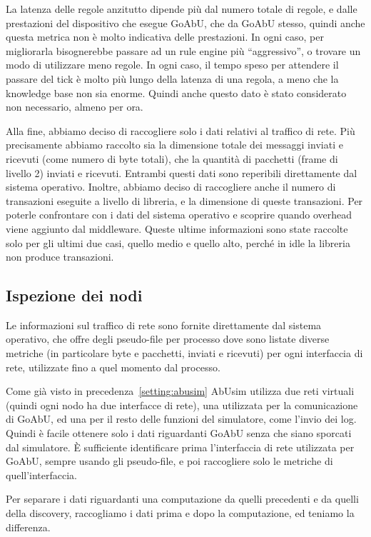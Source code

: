\documentclass[12pt, a4paper]{article}
\begin{document}
La latenza delle regole anzitutto dipende più dal numero totale di regole, e dalle prestazioni del dispositivo che esegue GoAbU, che da GoAbU stesso, quindi anche questa metrica non è molto indicativa delle prestazioni.
In ogni caso, per migliorarla bisognerebbe passare ad un rule engine più ``aggressivo'', o trovare un modo di utilizzare meno regole.
In ogni caso, il tempo speso per attendere il passare del tick è molto più lungo della latenza di una regola, a meno che la knowledge base non sia enorme.
Quindi anche questo dato è stato considerato non necessario, almeno per ora.

Alla fine, abbiamo deciso di raccogliere solo i dati relativi al traffico di rete. Più precisamente abbiamo raccolto sia la dimensione totale dei messaggi inviati e ricevuti (come numero di byte totali), che la quantità di pacchetti (frame di livello 2) inviati e ricevuti. Entrambi questi dati sono reperibili direttamente dal sistema operativo.
Inoltre, abbiamo deciso di raccogliere anche il numero di transazioni eseguite a livello di libreria, e la dimensione di queste transazioni. Per poterle confrontare con i dati del sistema operativo e scoprire quando overhead viene aggiunto dal middleware.
Queste ultime informazioni sono state raccolte solo per gli ultimi due casi, quello medio e quello alto, perché in idle la libreria non produce transazioni.

\subsection{Ispezione dei nodi}

Le informazioni sul traffico di rete sono fornite direttamente dal sistema operativo, che offre degli pseudo-file per processo dove sono listate diverse metriche (in particolare byte e pacchetti, inviati e ricevuti) per ogni interfaccia di rete, utilizzate fino a quel momento dal processo.

Come già visto in precedenza~\ref{setting:abusim} AbUsim utilizza due reti virtuali (quindi ogni nodo ha due interfacce di rete), una utilizzata per la comunicazione di GoAbU, ed una per il resto delle funzioni del simulatore, come l'invio dei log.
Quindi è facile ottenere solo i dati riguardanti GoAbU senza che siano sporcati dal simulatore. È sufficiente identificare prima l'interfaccia di rete utilizzata per GoAbU, sempre usando gli pseudo-file, e poi raccogliere solo le metriche di quell'interfaccia.

Per separare i dati riguardanti una computazione da quelli precedenti e da quelli della discovery, raccogliamo i dati prima e dopo la computazione, ed teniamo la differenza.
\end{document}
